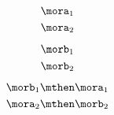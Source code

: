{\begin{forslides}
        \begin{equation}
            \label{eq:f1}
            \mora_1
        \end{equation}
        \begin{equation}
            \label{eq:f2}
            \mora_2
        \end{equation}

        \begin{equation}
            \label{eq:g1}
            \morb_1
        \end{equation}
        \begin{equation}
            \label{eq:g2}
            \morb_2
        \end{equation}


        \begin{equation}
            \label{eq:g1f1}
            \morb_1\mthen \mora_1
        \end{equation}
        \begin{equation}
            \label{eq:f2g2}
            \mora_2\mthen \morb_2
        \end{equation}
    \end{forslides}
}
